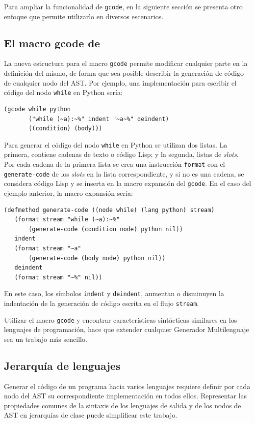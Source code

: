 Para ampliar la funcionalidad de \texttt{gcode}, en la siguiente sección se presenta otro enfoque que permite utilizarlo en diversos escenarios.

\subsection{El macro gcode de \gagm}
La nueva estructura para el macro \texttt{gcode} permite modificar cualquier parte en la definición del mismo, de forma que sea posible describir la generación de código de cualquier nodo del AST. Por ejemplo, una implementación para escribir el código del nodo \texttt{while} en Python sería: 
\begin{verbatim}
(gcode while python
       ("while (~a):~%" indent "~a~%" deindent) 
       ((condition) (body))) 
\end{verbatim}

Para generar el código del nodo \texttt{while} en Python se utilizan dos listas. La primera, contiene cadenas de texto o código Lisp; y la segunda, listas de \textit{slots}. Por cada cadena de la primera lista se crea una instrucción \texttt{format} con el \texttt{generate-code} de los \textit{slots} en la lista correspondiente, y si no es una cadena, se considera código Lisp y se inserta en la macro expansión del \texttt{gcode}. En el caso del ejemplo anterior, la macro expansión sería:

\begin{verbatim}
(defmethod generate-code ((node while) (lang python) stream)
   (format stream "while (~a):~%"
       (generate-code (condition node) python nil))
   indent
   (format stream "~a"
       (generate-code (body node) python nil))
   deindent
   (format stream "~%" nil))
\end{verbatim}

En este caso, los símbolos \texttt{indent} y \texttt{deindent}, aumentan o disminuyen la indentación de la generación de código escrita en el flujo \texttt{stream}. 

Utilizar el macro \texttt{gcode} y encontrar características sintácticas similares en los lenguajes de programación, hace que extender cualquier Generador Multilenguaje sea un trabajo más sencillo.  

\subsection{Jerarquía de lenguajes}
\label{sec:Jerarquía de lenguajes}
Generar el código de un programa hacia varios lenguajes requiere definir por cada nodo del AST su correspondiente implementación en todos ellos. Representar las propiedades comunes de la sintaxis de los lenguajes de salida y de los nodos de AST en jerarquías de clase puede simplificar este trabajo.

